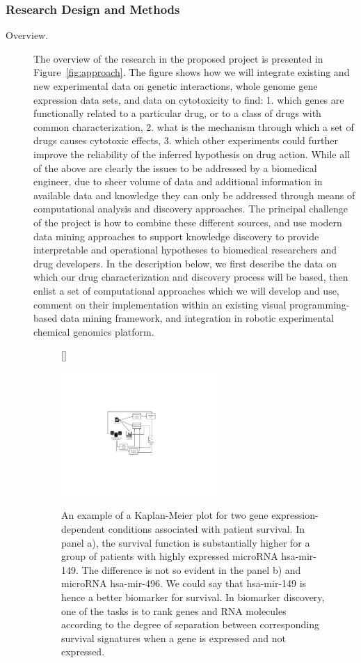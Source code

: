 \documentclass[11pt,a4paper]{article}
\begin{document}
\subsubsection{Research Design and Methods}
\begin{description}
	\item[Overview.] 
The overview of the research in the proposed project is presented in Figure~\ref{fig:approach}. The figure shows how we will integrate existing and new experimental data on genetic interactions, whole genome gene expression data sets, and data on cytotoxicity to find:
1. which genes are functionally related to a particular drug, or to a class of drugs with common characterization,
2. what is the mechanism through which a set of drugs causes cytotoxic effects,
3. which other experiments could further improve the reliability of the inferred hypothesis on drug action.
While all of the above are clearly the issues to be addressed by a biomedical engineer, due to sheer volume of data and additional information in available data and knowledge they can only be addressed through means of computational analysis and discovery approaches. The principal challenge of the project is how to combine these different sources, and use modern data mining approaches to support knowledge discovery to provide interpretable and operational hypotheses to biomedical researchers and drug developers. In the description below, we first describe the data on which our drug characterization and discovery process will be based, then enlist a set of computational approaches which we will develop and use, comment on their implementation within an existing visual programming-based data mining framework, and integration in robotic experimental chemical genomics platform.

\begin{figure}
[\FBwidth]
{\caption{An example of a Kaplan-Meier plot for two gene expression-dependent conditions associated with patient survival. In panel a), the survival function is substantially higher for a group of patients with highly expressed microRNA hsa-mir-149. The difference is not so evident in the panel b) and microRNA hsa-mir-496. We could say that hsa-mir-149 is hence a better biomarker for survival. In biomarker discovery, one of the tasks is to rank genes and RNA molecules according to the degree of separation between corresponding survival signatures when a gene is expressed and not expressed.}\label{fig:test}}
{\includegraphics[width=0.6\textwidth]{approach}}
\end{figure}



\end{description}
\end{document}
